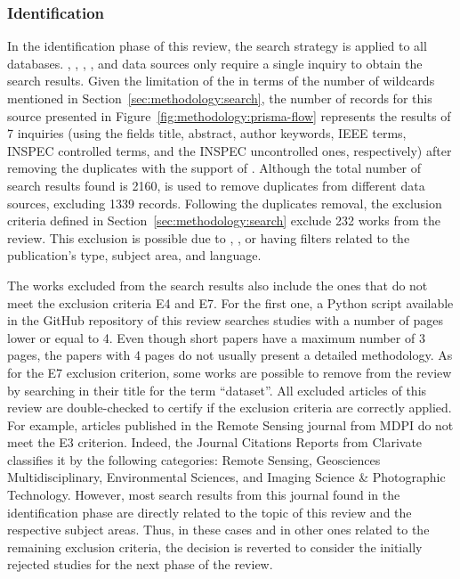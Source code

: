\documentclass[10pt,a4paper,notitlepage,twocolumn,oneside]{article}
\begin{document}
\subsubsection{Identification}

In the identification phase of this review, the search strategy is applied to all databases. , , , , and  data sources only require a single inquiry to obtain the search results. Given the limitation of the  in terms of the number of wildcards mentioned in Section~\ref{sec:methodology:search}, the number of records for this source presented in Figure~\ref{fig:methodology:prisma-flow} represents the results of 7 inquiries (using the fields title, abstract, author keywords, IEEE terms, INSPEC controlled terms, and the INSPEC uncontrolled ones, respectively) after removing the duplicates with the support of . Although the total number of search results found is 2160,  is used to remove duplicates from different data sources, excluding 1339 records. Following the duplicates removal, the exclusion criteria defined in Section~\ref{sec:methodology:search} exclude 232 works from the review. This exclusion is possible due to , , or  having filters related to the publication's type, subject area, and language.

The works excluded from the search results also include the ones that do not meet the exclusion criteria E4 and E7. For the first one, a Python script available in the GitHub repository of this review searches studies with a number of pages lower or equal to 4. Even though short papers have a maximum number of 3 pages, the papers with 4 pages do not usually present a detailed methodology.
As for the E7 exclusion criterion, some works are possible to remove from the review by searching in their title for the term ``dataset''.
All excluded articles of this review are double-checked to certify if the exclusion criteria are correctly applied. For example, articles published in the Remote Sensing journal from MDPI do not meet the E3 criterion. Indeed, the Journal Citations Reports from Clarivate classifies it by the following categories: Remote Sensing, Geosciences Multidisciplinary, Environmental Sciences, and Imaging Science \& Photographic Technology. However, most search results from this journal found in the identification phase are directly related to the topic of this review and the respective subject areas. Thus, in these cases and in other ones related to the remaining exclusion criteria, the decision is reverted to consider the initially rejected studies for the next phase of the review.
\end{document}
